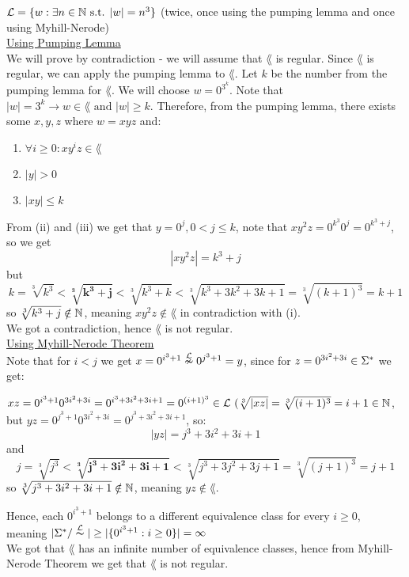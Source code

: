 $\mathcal{L}=\{w : \exists n \in \mathbb{N} \text{ s.t. } |w| = n^3\}$
(twice, once using the pumping lemma and once using Myhill-Nerode) \\

\underline{Using Pumping Lemma} \\

We will prove by contradiction - we will assume that $\lang$ is regular.
Since $\lang$ is regular, we can apply the pumping lemma to $\lang$. Let $k$
be the number from the pumping lemma for $\lang$. We will choose $w = 0^{3^k}$.
Note that $|w|=3^k \rightarrow w \in \lang \text{ and } |w| \geq k$.
Therefore, from the pumping lemma, there exists some $x, y, z$ where $w = xyz$ and:

\begin{enumerate}
    \item $\forall i \geq 0: x y^i z \in \lang$
    \item $|y| > 0$
    \item $|xy| \leq k$
\end{enumerate}

From (ii) and (iii) we get that $y=0^j, 0 < j \leq k$,
note that $x y^2 z = 0^{k^3} 0^j = 0^{k^3+j}$,
so we get
\[
    |x y^2 z| = k^3+j
\]
but
\[
    k = \sqrt[3]{k^3} < \boldsymbol{\sqrt[3]{k^3+j}} < \sqrt[3]{k^3+k} < \sqrt[3]{k^3+3k^2+3k+1} = \sqrt[3]{(k+1)^3} = k+1
\]
so $\sqrt[3]{k^3+j} \notin \mathbb{N}$, meaning $x y^2 z \notin \lang$ in contradiction with (i). \\
We got a contradiction, hence $\lang$ is not regular. \\


\underline{Using Myhill-Nerode Theorem} \\

Note that for $i < j$ we get $x = 0^{i^3+1} \overset{\mathcal{L}}{\nsim} 0^{j^3+1}  = y$,
since for $z=0^{3i^2+3i} \in \Sigma^*$ we get:

$xz = 0^{i^3+1}0^{3i^2+3i}=0^{i^3+3i^2+3i+1}=0^{(i+1)^3} \in \mathcal{L} \text{ } (\sqrt[3]{|xz|}=\sqrt[3]{(i+1)^3}=i+1 \in \mathbb{N}$, \\
but $yz = 0^{j^3+1}0^{3i^2+3i}=0^{j^3+3i^2+3i+1}$, so:
\[
    |yz| = j^3+3i^2+3i+1
\]
and
\[
    j = \sqrt[3]{j^3} < \boldsymbol{\sqrt[3]{j^3+3i^2+3i+1}} < \sqrt[3]{j^3+3j^2+3j+1} = \sqrt[3]{(j+1)^3} = j+1
\]
so $\sqrt[3]{j^3+3i^2+3i+1} \notin \mathbb{N}$, meaning $yz \notin \lang$.

Hence, each $ 0^{i^3+1} $ belongs to a different equivalence class for every $i \geq 0$, \\
meaning $|\Sigma^* / \overset{\mathcal{L}}{\thicksim}| \geq |\{0^{i^3+1}: i \geq 0\}| = \infty$ \\
We got that $\lang$ has an infinite number of equivalence classes, hence from
Myhill-Nerode Theorem we get that $\lang$ is not regular. \\